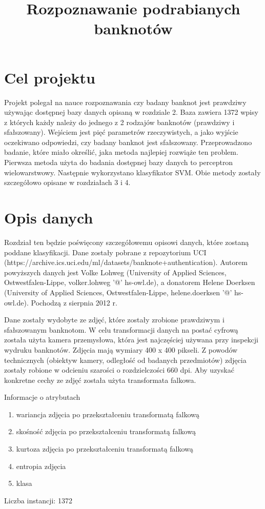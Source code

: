 \documentclass{classrep}
\author{
  \studentinfo{Norbert Landrat}{213518} \and
  \studentinfo{Adrian Grzelak}{213506}
}
\title{Rozpoznawanie podrabianych banknotów}
\begin{document}
\maketitle

\section{Cel projektu}
Projekt polegał na nauce rozpoznawania czy badany banknot jest prawdziwy używając dostępnej bazy danych opisaną w rozdziale 2. Baza zawiera 1372 wpisy z których każdy należy do jednego z 2 rodzajów banknotów (prawdziwy i sfałszowany). Wejściem jest pięć parametrów rzeczywistych, a jako wyjście oczekiwano odpowiedzi, czy badany banknot jest sfałszowany. Przeprowadzono badanie, które miało określić, jaka metoda najlepiej rozwiąże ten problem. Pierwsza metoda użyta do badania dostępnej bazy danych to perceptron wielowarstwowy. Następnie wykorzystano klasyfikator SVM. Obie metody zostały szczegółowo opisane w rozdziałach 3 i 4.

\section{Opis danych}
Rozdział ten będzie poświęcony szczegółowemu opisowi danych, które zostaną poddane klasyfikacji. Dane zostały pobrane z repozytorium UCI (https://archive.ics.uci.edu/ml/datasets/banknote+authentication). Autorem powyższych danych jest Volke Lohweg (University of Applied Sciences, Ostwestfalen-Lippe, volker.lohweg '@' hs-owl.de), a donatorem Helene Doerksen (University of Applied Sciences, Ostwestfalen-Lippe, helene.doerksen '@' hs-owl.de). Pochodzą z sierpnia 2012 r.

Dane zostały wydobyte ze zdjęć, które zostały zrobione prawdziwym i sfałszowanym banknotom. W celu transformacji danych na postać cyfrową została użyta kamera przemysłowa, która jest najczęściej używana przy inspekcji wydruku banknotów. Zdjęcia mają wymiary 400 x 400 pikseli. Z powodów technicznych (obiektyw kamery, odległość od badanych przedmiotów) zdjęcia zostały robione w odcieniu szarości  o rozdzielczości 660 dpi. Aby uzyskać konkretne cechy ze zdjęć została użyta transformata falkowa. 

Informacje o atrybutach
\begin{enumerate}
\item wariancja zdjęcia po przekształceniu transformatą falkową
\item skośność zdjęcia po przekształceniu transformatą falkową
\item kurtoza zdjęcia po przekształceniu transformatą falkową
\item entropia zdjęcia
\item klasa
\end{enumerate}
Liczba instancji: 1372
\end{document}

